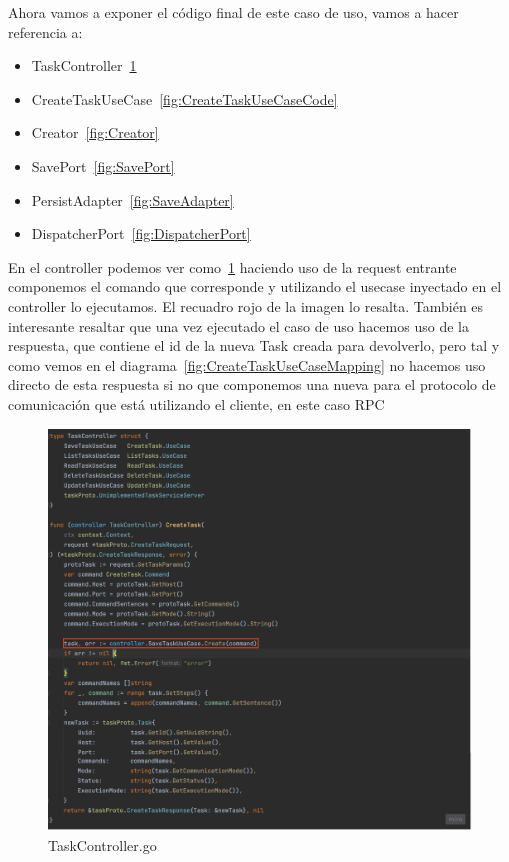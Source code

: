 Ahora vamos a exponer el código final de este caso de uso, vamos a hacer referencia a:
\begin{itemize}
    \item TaskController~\cref{fig:TaskControler}
    \item CreateTaskUseCase~\cref{fig:CreateTaskUseCaseCode}
    \item Creator~\cref{fig:Creator}
    \item SavePort~\cref{fig:SavePort}
    \item PersistAdapter~\cref{fig:SaveAdapter}
    \item DispatcherPort~\cref{fig:DispatcherPort}
\end{itemize}

En el controller podemos ver como~\cref{fig:TaskControler} haciendo uso de la request entrante componemos el comando que corresponde y utilizando el usecase inyectado en el controller lo ejecutamos. El recuadro rojo de la imagen lo resalta. También es interesante resaltar que una vez ejecutado el caso de uso hacemos uso de la respuesta, que contiene el id de la nueva Task creada para devolverlo, pero tal y como vemos en el diagrama~\cref{fig:CreateTaskUseCaseMapping} no hacemos uso directo de esta respuesta si no que componemos una nueva para el protocolo de comunicación que está utilizando el cliente, en este caso RPC

\begin{figure}[H]
    \centering
    \includegraphics[height=0.5\textheight]{./part/Ejecucion/Seguimiento/CreateTaskUseCase/img/PFM - TaskController}
    \caption{TaskController.go}\label{fig:TaskControler}
\end{figure}

